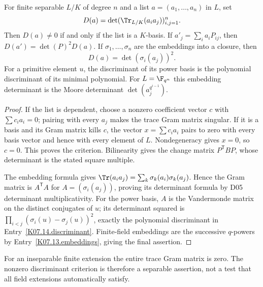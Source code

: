 \begin{theorem}
For finite separable $L/K$ of degree $n$ and a list $a=(a_1,\ldots,a_n)$ in $L$, set
\[D(a)=\det(\Tr_{L/K}(a_i a_j))_{i,j=1}^n.\]
Then $D(a)\ne0$ if and only if the list is a $K$-basis. If $a'_j=\sum_i a_i P_{ij}$, then $D(a')=\det(P)^2D(a)$. If $\sigma_1,\ldots,\sigma_n$ are the embeddings into a closure, then
\[D(a)=\det(\sigma_i(a_j))^2.\]
For a primitive element $u$, the discriminant of its power basis is the polynomial discriminant of its minimal polynomial. For $L=\F_{q^n}$ this embedding determinant is the Moore determinant $\det(a_j^{q^{i-1}})$.
\end{theorem}
\begin{proof}
If the list is dependent, choose a nonzero coefficient vector $c$ with $\sum c_i a_i=0$; pairing with every $a_j$ makes the trace Gram matrix singular. If it is a basis and its Gram matrix kills $c$, the vector $x=\sum c_i a_i$ pairs to zero with every basis vector and hence with every element of $L$. Nondegeneracy gives $x=0$, so $c=0$. This proves the criterion. Bilinearity gives the change matrix $P^{\mathsf T}BP$, whose determinant is the stated square multiple.

The embedding formula gives $\Tr(a_i a_j)=\sum_k\sigma_k(a_i)\sigma_k(a_j)$. Hence the Gram matrix is $A^{\mathsf T}A$ for $A=(\sigma_i(a_j))$, proving its determinant formula by D05 determinant multiplicativity. For the power basis, $A$ is the Vandermonde matrix on the distinct conjugates of $u$; its determinant squared is $\prod_{i<j}(\sigma_i(u)-\sigma_j(u))^2$, exactly the polynomial discriminant in Entry~\ref{K07.14.discriminant}. Finite-field embeddings are the successive $q$-powers by Entry~\ref{K07.13.embeddings}, giving the final assertion.
\end{proof}
\begin{remark}
For an inseparable finite extension the entire trace Gram matrix is zero. The nonzero discriminant criterion is therefore a separable assertion, not a test that all field extensions automatically satisfy.
\end{remark}

